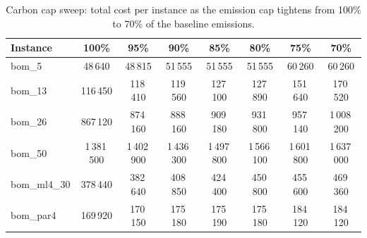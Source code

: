 \begin{table}[!htbp]\centering\scriptsize
\setlength{\tabcolsep}{3pt}
\caption{Carbon cap sweep: total cost per instance as the emission cap tightens from 100\% to 70\% of the baseline emissions.}\label{tab:cap}
\begin{tabular}{lccccccc}
\toprule
Instance & 100\% & 95\% & 90\% & 85\% & 80\% & 75\% & 70\%\\
\midrule
bom\_5 & 48\,640 & 48\,815 & 51\,555 & 51\,555 & 51\,555 & 60\,260 & 60\,260 \\
bom\_13 & 116\,450 & 118\,410 & 119\,560 & 127\,100 & 127\,890 & 151\,640 & 170\,520 \\
bom\_26 & 867\,120 & 874\,160 & 888\,160 & 909\,180 & 931\,800 & 957\,140 & 1\,008\,200 \\
bom\_50 & 1\,381\,500 & 1\,402\,900 & 1\,436\,300 & 1\,497\,800 & 1\,566\,100 & 1\,601\,800 & 1\,637\,000 \\
bom\_ml4\_30 & 378\,440 & 382\,640 & 408\,850 & 424\,400 & 450\,800 & 455\,600 & 469\,360 \\
bom\_par4 & 169\,920 & 170\,150 & 175\,180 & 175\,190 & 175\,180 & 184\,120 & 184\,120 \\
\bottomrule
\end{tabular}
\end{table}
